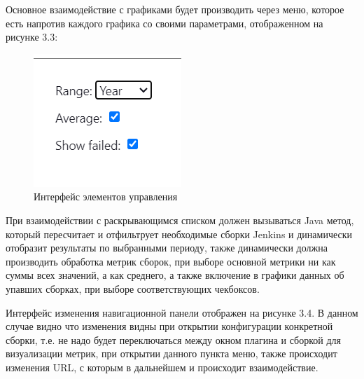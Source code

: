 Основное взаимодействие с графиками будет производить через меню, которое есть напротив каждого графика со своими параметрами, отображенном на рисунке 3.3:

\begin{figure}[ht!] 
	\center
	\includegraphics [scale=0.47] {my_folder/images//ui2}
	\caption{Интерфейс элементов управления} 
	\label{fig:ArchitectureJenkins}  
\end{figure}

При взаимодействии с раскрывающимся списком должен вызываться Java метод, который пересчитает и отфильтрует необходимые сборки Jenkins и динамически отобразит результаты по выбранными периоду, также динамически должна производить обработка метрик сборок, при выборе основной метрики ни как суммы всех значений, а как среднего, а также включение в графики данных об упавших сборках, при выборе соответствующих чекбоксов.

Интерфейс изменения навигационной панели отображен на рисунке 3.4. В данном случае видно что изменения видны при открытии конфигурации конкретной сборки, т.е. не надо будет переключаться между окном плагина и сборкой для визуализации метрик, при открытии данного пункта меню, также происходит изменения URL, с которым в дальнейшем и происходит взаимодействие.

